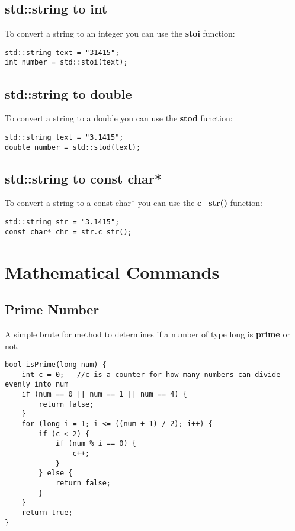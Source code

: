 \subsection*{std::string to int}
To convert a string to an integer you can use the \textbf{stoi} function:
\begin{lstlisting}
std::string text = "31415";
int number = std::stoi(text);
\end{lstlisting}

\subsection*{std::string to double}
To convert a string to a double you can use the \textbf{stod} function:
\begin{lstlisting}
std::string text = "3.1415";
double number = std::stod(text);
\end{lstlisting}

\subsection*{std::string to const char*}
To convert a string to a const char* you can use the \textbf{c\_str()} function:
\begin{lstlisting}
std::string str = "3.1415";
const char* chr = str.c_str();
\end{lstlisting}

















\section{Mathematical Commands}

\subsection*{Prime Number}
A simple brute for method to determines if a number of type long is \textbf{prime} or not.
\begin{lstlisting}
bool isPrime(long num) {  
	int c = 0;   //c is a counter for how many numbers can divide evenly into num
	if (num == 0 || num == 1 || num == 4) {
		return false;
	}
	for (long i = 1; i <= ((num + 1) / 2); i++) {
		if (c < 2) {
			if (num % i == 0) {
				c++;
			}
		} else {
			return false;
		}
	}
	return true;
}
\end{lstlisting}


